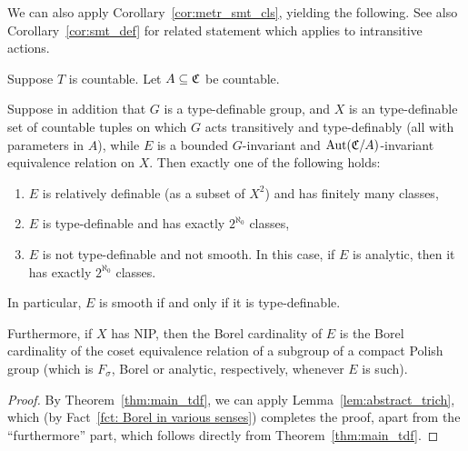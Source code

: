 	
	We can also apply Corollary~\ref{cor:metr_smt_cls}, yielding the following. See also Corollary~\ref{cor:smt_def} for related statement which applies to intransitive actions.
	\begin{cor}
		\label{cor:trich+_tdf}
		Suppose $T$ is countable. Let $A\subseteq {\mathfrak C}$ be countable.
		
		Suppose in addition that $G$ is a type-definable group, and $X$ is an type-definable set of countable tuples on which $G$ acts transitively and type-definably (all with parameters in $A$), while $E$ is a bounded $G$-invariant and $\operatorname{{Aut}}({\mathfrak C}/A)$-invariant equivalence relation on $X$. Then exactly one of the following holds:
		\begin{enumerate}
			\item
			$E$ is relatively definable (as a subset of $X^2$) and has finitely many classes,
			\item
			$E$ is type-definable and has exactly $2^{\aleph_0}$ classes,
			\item
			$E$ is not type-definable and not smooth. In this case, if $E$ is analytic, then it has exactly $2^{\aleph_0}$ classes.
		\end{enumerate}
		In particular, $E$ is smooth if and only if it is type-definable.
		
		Furthermore, if $X$ has NIP, then the Borel cardinality of $E$ is the Borel cardinality of the coset equivalence relation of a subgroup of a compact Polish group (which is $F_\sigma$, Borel or analytic, respectively, whenever $E$ is such).
	\end{cor}
	\begin{proof}
		By Theorem~\ref{thm:main_tdf}, we can apply Lemma~\ref{lem:abstract_trich}, which (by Fact~\ref{fct: Borel in various senses}) completes the proof, apart from the ``furthermore'' part, which follows directly from Theorem~\ref{thm:main_tdf}.
	\end{proof}
	
